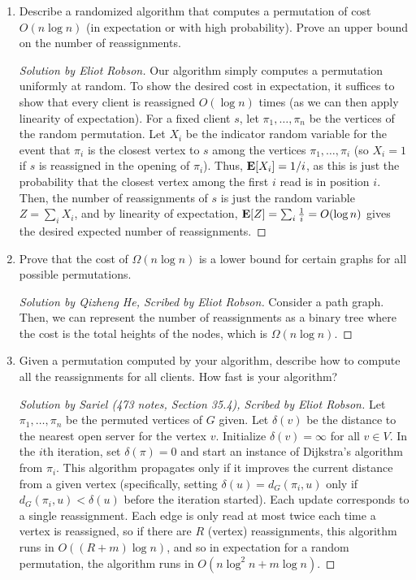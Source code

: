 \documentclass{article}
\newenvironment{solution}[1]{\begin{proof}[Solution by #1]}{\end{proof}}
\newenvironment{scribed}[2]{\begin{proof}[Solution by #1, Scribed by #2]}{\end{proof}}
\begin{document}
\begin{enumerate}
    \item Describe a randomized algorithm that computes a permutation of cost \(O(n \log n)\) (in expectation or with high probability). Prove an upper bound on the number of reassignments.
    
    \begin{solution}{Eliot Robson}
        Our algorithm simply computes a permutation uniformly at random. To show the desired cost in expectation, it suffices to show that every client is reassigned \(O(\log n)\) times (as we can then apply linearity of expectation). For a fixed client \(s\), let \(\pi_1, \dots, \pi_n\) be the vertices of the random permutation. Let \(X_i\) be the indicator random variable for the event that \(\pi_i\) is the closest vertex to \(s\) among the vertices \(\pi_1, \dots, \pi_i\) (so \(X_i = 1\) if \(s\) is reassigned in the opening of \(\pi_i\)). Thus, \(\Exp{X_i} = 1/i\), as this is just the probability that the closest vertex among the first \(i\) read is in position \(i\). Then, the number of reassignments of \(s\) is just the random variable \(Z = \sum_i X_i\), and by linearity of expectation, \(\Exp{Z} = \sum_i \frac{1}{i} = O(\log n)\) gives the desired expected number of reassignments.
    \end{solution}
    
    \item Prove that the cost of \(\Omega(n \log n)\) is a lower bound for certain graphs for all possible permutations.
    
    \begin{scribed}{Qizheng He}{Eliot Robson}
        Consider a path graph. Then, we can represent the number of reassignments as a binary tree where the cost is the total heights of the nodes, which is \(\Omega(n \log n)\).
    \end{scribed}
    
    \item Given a permutation computed by your algorithm, describe how to compute all the reassignments for all clients. How fast is your algorithm?
    
    \begin{scribed}{Sariel (473 notes, Section 35.4)}{Eliot Robson}
        Let \(\pi_1, \dots, \pi_n\) be the permuted vertices of \(G\) given. Let \(\delta(v)\) be the distance to the nearest open server for the vertex \(v\). Initialize \(\delta(v) = \infty\) for all \(v \in V\). In the \(i\)th iteration, set \(\delta(\pi) = 0\) and start an instance of Dijkstra's algorithm from \(\pi_i\). This algorithm propagates only if it improves the current distance from a given vertex (specifically, setting \(\delta(u) = d_G (\pi_i, u)\) only if \(d_G (\pi_i, u) < \delta(u)\) before the iteration started). Each update corresponds to a single reassignment. Each edge is only read at most twice each time a vertex is reassigned, so if there are \(R\) (vertex) reassignments, this algorithm runs in \(O((R + m) \log n)\), and so in expectation for a random permutation, the algorithm runs in \(O(n \log^2 n + m \log n)\).
    \end{scribed}
\end{enumerate}
\end{document}
